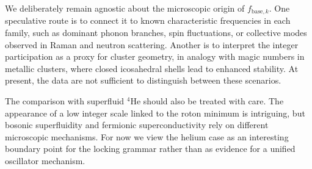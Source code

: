 \documentclass[aps,prb,twocolumn,superscriptaddress,floatfix,nofootinbib]{revtex4-2}
\begin{document}
We deliberately remain agnostic about the microscopic origin of
\(f_{\mathrm{base},k}\). One speculative route is to connect it to known
characteristic frequencies in each family, such as dominant phonon branches,
spin fluctuations, or collective modes observed in Raman and neutron
scattering. Another is to interpret the integer participation as a proxy for
cluster geometry, in analogy with magic numbers in metallic clusters, where
closed icosahedral shells lead to enhanced stability. At present, the data
are not sufficient to distinguish between these scenarios.

The comparison with superfluid \(^4\)He should also be treated with care.
The appearance of a low integer scale linked to the roton minimum is
intriguing, but bosonic superfluidity and fermionic superconductivity rely
on different microscopic mechanisms. For now we view the helium case as an
interesting boundary point for the locking grammar rather than as evidence
for a unified oscillator mechanism.
\end{document}
